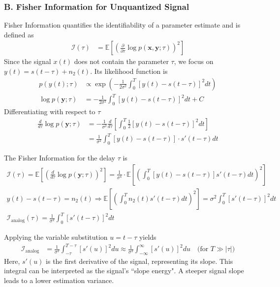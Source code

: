 \documentclass{article}
\begin{document}
	\subsubsection*{B. Fisher Information for Unquantized Signal}
	Fisher Information quantifies the identifiability of a parameter estimate and is defined as
	\begin{align}
		\mathcal{I}(\tau) &= \mathbb{E}\left[ \left( \frac{\partial}{\partial \tau} \log p(\mathbf{x}, \mathbf{y}; \tau) \right)^2 \right] 
	\end{align}
	Since the signal $x(t)$ does not contain the parameter $\tau$, we focus on $y(t) = s(t - \tau) + n_2(t)$. Its likelihood function is
	\begin{align}
		p(y(t); \tau) &\propto \exp \left( -\frac{1}{2\sigma^2} \int_{0}^{T} \left[ y(t) - s(t - \tau) \right]^2 dt \right)  \\
		\log p(\mathbf{y}; \tau) &= -\frac{1}{2\sigma^2} \int_{0}^{T} \left[ y(t) - s(t - \tau) \right]^2 dt + C 
	\end{align}
	Differentiating with respect to $\tau$
	\begin{equation}
		\begin{aligned}
			\frac{d}{d\tau} \log p(\mathbf{y}; \tau) &= -\frac{1}{\sigma^2} \frac{d}{d\tau}\left[ \int_{0}^{T} \frac{1}{2} \left[ y(t) - s(t - \tau) \right]^2 dt \right]  \\
			&= \frac{1}{\sigma^2} \int_{0}^{T} \left[ y(t) - s(t - \tau) \right] \cdot s'(t - \tau)  dt 
		\end{aligned}
	\end{equation}
	
	The Fisher Information for the delay $\tau$ is
	\begin{gather}
		\mathcal{I}(\tau) = \mathbb{E}\left[ \left( \frac{d}{d\tau} \log p(\mathbf{y}; \tau) \right)^2 \right] = \frac{1}{\sigma^4} \cdot \mathbb{E}\left[ \left( \int_{0}^{T} \left[ y(t) - s(t - \tau) \right] s'(t - \tau) dt \right)^2 \right]  \\
		y(t) - s(t - \tau) = n_2(t) \Rightarrow \mathbb{E}\left[ \left( \int_{0}^{T} n_2(t) s'(t - \tau) dt \right)^2 \right] = \sigma^2 \int_{0}^{T} [s'(t - \tau)]^2 dt  \\
		\mathcal{I}_{\text{analog}}(\tau) = \frac{1}{\sigma^2} \int_{0}^{T} [s'(t - \tau)]^2 dt 
	\end{gather}
	
	Applying the variable substitution $u = t - \tau$ yields
	\begin{align}
		\mathcal{I}_{\text{analog}} &= \frac{1}{\sigma^2} \int_{-\tau}^{T-\tau} [s'(u)]^2 du \approx \frac{1}{\sigma^2} \int_{-\infty}^{\infty} [s'(u)]^2 du \quad \text{(for $T \gg |\tau|$)} 
	\end{align}
	Here, $s'(u)$ is the first derivative of the signal, representing its slope. This integral can be interpreted as the signal's ``slope energy". A steeper signal slope leads to a lower estimation variance.
	
\end{document}
